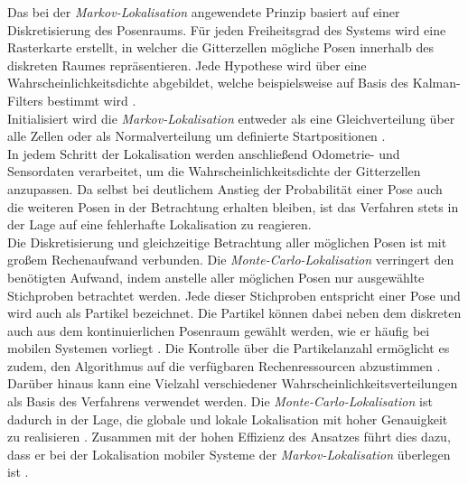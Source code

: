 Das bei der \textit{Markov-Lokalisation} angewendete Prinzip basiert auf einer Diskretisierung des Posenraums. Für jeden Freiheitsgrad des Systems wird eine Rasterkarte erstellt, in welcher die Gitterzellen mögliche Posen innerhalb des diskreten Raumes repräsentieren. Jede Hypothese wird über eine Wahrscheinlichkeitsdichte abgebildet, welche beispielsweise auf Basis des Kalman-Filters bestimmt wird \cite{Hertzberg2012}.\\
Initialisiert wird die \textit{Markov-Lokalisation} entweder als eine Gleichverteilung über alle Zellen oder als Normalverteilung um definierte Startpositionen \cite{Hertzberg2012}.\\
In jedem Schritt der Lokalisation werden anschließend Odometrie- und Sensordaten verarbeitet, um die Wahrscheinlichkeitsdichte der Gitterzellen anzupassen. Da selbst bei deutlichem Anstieg der Probabilität einer Pose auch die weiteren Posen in der Betrachtung erhalten bleiben, ist das Verfahren stets in der Lage auf eine fehlerhafte Lokalisation zu reagieren.\\


Die Diskretisierung und gleichzeitige Betrachtung aller möglichen Posen ist mit großem Rechenaufwand verbunden. Die \textit{Monte-Carlo-Lokalisation} verringert den benötigten Aufwand, indem anstelle aller möglichen Posen nur ausgewählte Stichproben betrachtet werden. Jede dieser Stichproben entspricht einer Pose und wird auch als Partikel bezeichnet. Die Partikel können dabei neben dem diskreten auch aus dem kontinuierlichen Posenraum gewählt werden, wie er häufig bei mobilen Systemen vorliegt \cite{Fox2001}. Die Kontrolle über die Partikelanzahl ermöglicht es zudem, den Algorithmus auf die verfügbaren Rechenressourcen abzustimmen \cite{Thrun2001}.\\
Darüber hinaus kann eine Vielzahl verschiedener Wahrscheinlichkeitsverteilungen als Basis des Verfahrens verwendet werden. Die \textit{Monte-Carlo-Lokalisation} ist dadurch in der Lage, die globale und lokale Lokalisation mit hoher Genauigkeit zu realisieren \cite{Thrun2005}. Zusammen mit der hohen Effizienz des Ansatzes führt dies dazu, dass er bei der Lokalisation mobiler Systeme der \textit{Markov-Lokalisation} überlegen ist \cite{Fox2001}.

